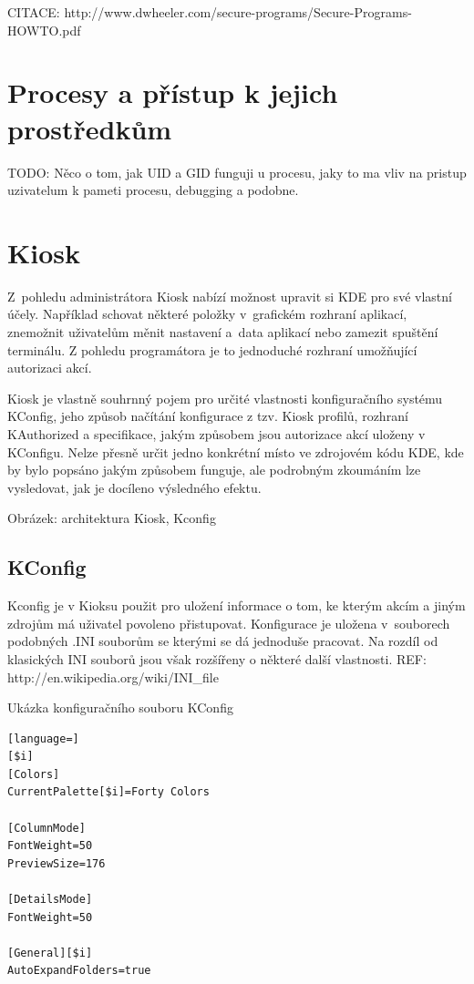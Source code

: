 CITACE: http://www.dwheeler.com/secure-programs/Secure-Programs-HOWTO.pdf

\section{Procesy a přístup k jejich prostředkům}
TODO: Něco o tom, jak UID a GID funguji u procesu, jaky to ma vliv na pristup uzivatelum k pameti procesu, debugging a podobne.

\section{Kiosk}
Z~pohledu administrátora Kiosk nabízí možnost upravit si KDE pro své vlastní účely. Například schovat některé položky v~grafickém rozhraní aplikací, znemožnit uživatelům měnit nastavení a~data aplikací nebo zamezit spuštění terminálu. Z pohledu programátora je to jednoduché rozhraní umožňující autorizaci akcí.

Kiosk je vlastně souhrnný pojem pro určité vlastnosti konfiguračního systému KConfig, jeho způsob načítání konfigurace z tzv. Kiosk profilů, rozhraní KAuthorized a specifikace, jakým způsobem jsou autorizace akcí uloženy v KConfigu. Nelze přesně určit jedno konkrétní místo ve zdrojovém kódu KDE, kde by bylo popsáno jakým způsobem funguje, ale podrobným zkoumáním lze vysledovat, jak je docíleno výsledného efektu.

Obrázek: architektura Kiosk, Kconfig

\subsection*{KConfig}
Kconfig je v Kioksu použit pro uložení informace o tom, ke kterým akcím a jiným zdrojům má uživatel povoleno přistupovat. Konfigurace je uložena v~souborech podobných .INI souborům se kterými se dá jednoduše pracovat. Na rozdíl od klasických INI souborů jsou však rozšířeny o některé další vlastnosti. REF: http://en.wikipedia.org/wiki/INI\_file
\begin{mylisting}
\caption{Ukázka konfiguračního souboru KConfig}
\label{kconf_exmpl}
\begin{lstlisting}[language=]
[$i]
[Colors]
CurrentPalette[$i]=Forty Colors

[ColumnMode]
FontWeight=50
PreviewSize=176

[DetailsMode]
FontWeight=50

[General][$i]
AutoExpandFolders=true
\end{lstlisting}
\end{mylisting}

